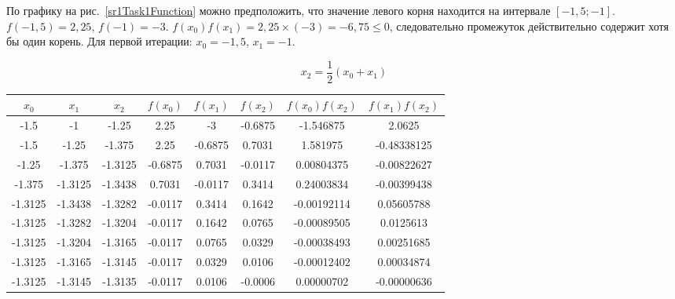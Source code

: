 \documentclass[10pt, a4paper, titlepage]{article}
\begin{document}
По графику на рис.~\ref{sr1Task1Function} можно предположить, что значение левого корня находится на интервале $[-1,5;-1]$. $f(-1,5)=2,25$, $f(-1)=-3$. $f(x_0)f(x_1)=2,25\times(-3)=-6,75\leq0$, следовательно промежуток действительно содержит хотя бы один корень. Для первой итерации: $x_0=-1,5$, $x_1=-1$.

$$x_2=\frac{1}{2}(x_0+x_1)$$

\begin{center}
    \begin{tabular}{|c|c|c|c|c|c|c|c|}
        \hline
        $x_0$ & $x_1$ & $x_2$ & $f(x_0)$ & $f(x_1)$ & $f(x_2)$ & $f(x_0)f(x_2)$ & $f(x_1)f(x_2)$ \\ \hline
        
        -1.5 & -1 & -1.25 &	2.25 & -3 & -0.6875 & -1.546875 & 2.0625 \\ \hline
        
        -1.5 & -1.25 & -1.375 &	2.25 &	-0.6875	& 0.7031 & 1.581975 & -0.48338125 \\ \hline
        
        -1.25 &	-1.375 & -1.3125 & -0.6875 & 0.7031 & -0.0117 &	0.00804375 & -0.00822627 \\ \hline
        
        -1.375 & -1.3125 & -1.3438 & 0.7031 & -0.0117 &	0.3414 & 0.24003834 & -0.00399438 \\ \hline
        
        -1.3125 & -1.3438 & -1.3282 & -0.0117 &	0.3414 & 0.1642	& -0.00192114 &	0.05605788 \\ \hline
        
        -1.3125 & -1.3282 & -1.3204 & -0.0117 & 0.1642 & 0.0765 & -0.00089505 & 0.0125613 \\ \hline
        
        -1.3125 & -1.3204 & -1.3165 & -0.0117 & 0.0765 & 0.0329 & -0.00038493 & 0.00251685 \\ \hline
        
        -1.3125 & -1.3165 & -1.3145 & -0.0117 & 0.0329 & 0.0106 & -0.00012402 & 0.00034874 \\ \hline
        
        -1.3125 & -1.3145 & -1.3135 & -0.0117 & 0.0106 & -0.0006 & 0.00000702 & -0.00000636 \\ \hline
        
    \end{tabular}
\end{center}
\end{document}
